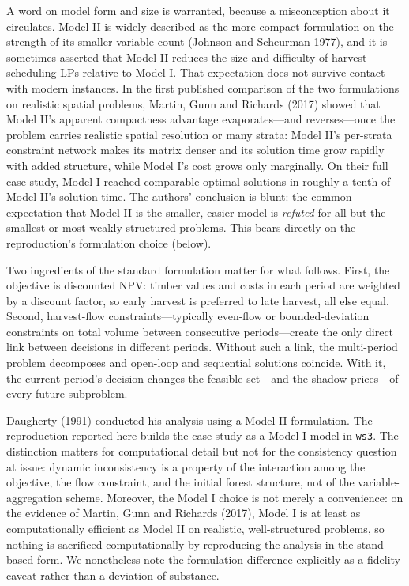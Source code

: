 \documentclass[12pt]{article}
\begin{document}
A word on model form and size is warranted, because a misconception about it circulates. Model II is widely described as the more compact formulation on the strength of its smaller variable count (Johnson and Scheurman 1977), and it is sometimes asserted that Model II reduces the size and difficulty of harvest-scheduling LPs relative to Model I. That expectation does not survive contact with modern instances. In the first published comparison of the two formulations on realistic spatial problems, Martin, Gunn and Richards (2017) showed that Model II's apparent compactness advantage evaporates---and reverses---once the problem carries realistic spatial resolution or many strata: Model II's per-strata constraint network makes its matrix denser and its solution time grow rapidly with added structure, while Model I's cost grows only marginally. On their full case study, Model I reached comparable optimal solutions in roughly a tenth of Model II's solution time. The authors' conclusion is blunt: the common expectation that Model II is the smaller, easier model is \emph{refuted} for all but the smallest or most weakly structured problems. This bears directly on the reproduction's formulation choice (below).

Two ingredients of the standard formulation matter for what follows. First, the objective is discounted NPV: timber values and costs in each period are weighted by a discount factor, so early harvest is preferred to late harvest, all else equal. Second, harvest-flow constraints---typically even-flow or bounded-deviation constraints on total volume between consecutive periods---create the only direct link between decisions in different periods. Without such a link, the multi-period problem decomposes and open-loop and sequential solutions coincide. With it, the current period's decision changes the feasible set---and the shadow prices---of every future subproblem.

Daugherty (1991) conducted his analysis using a Model II formulation. The reproduction reported here builds the case study as a Model I model in \texttt{ws3}. The distinction matters for computational detail but not for the consistency question at issue: dynamic inconsistency is a property of the interaction among the objective, the flow constraint, and the initial forest structure, not of the variable-aggregation scheme. Moreover, the Model I choice is not merely a convenience: on the evidence of Martin, Gunn and Richards (2017), Model I is at least as computationally efficient as Model II on realistic, well-structured problems, so nothing is sacrificed computationally by reproducing the analysis in the stand-based form. We nonetheless note the formulation difference explicitly as a fidelity caveat rather than a deviation of substance.
\end{document}
